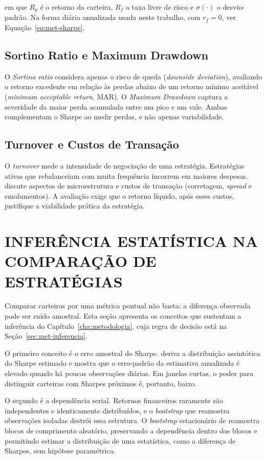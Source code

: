 \noindent em que $R_p$ é o retorno da carteira, $R_f$ a taxa livre de risco e $\sigma(\cdot)$ o desvio-padrão. Na forma diária anualizada usada neste trabalho, com $r_f = 0$, ver Equação~\eqref{eq:met-sharpe}.

\subsection{Sortino Ratio e Maximum Drawdown}

O \textit{Sortino ratio} \citep{Sortino1994} considera apenas o risco de queda (\textit{downside deviation}), avaliando o retorno excedente em relação às perdas abaixo de um retorno mínimo aceitável (\textit{minimum acceptable return}, MAR). O \textit{Maximum Drawdown} \citep{Magdon2004} captura a severidade da maior perda acumulada entre um pico e um vale. Ambas complementam o Sharpe ao medir perdas, e não apenas variabilidade.

\subsection{Turnover e Custos de Transação}

O \textit{turnover} mede a intensidade de negociação de uma estratégia. Estratégias ativas que rebalanceiam com muita frequência incorrem em maiores despesas. \citet{Harris2003} discute aspectos de microestrutura e custos de transação (corretagem, \textit{spread} e emolumentos). A avaliação exige que o retorno líquido, após esses custos, justifique a viabilidade prática da estratégia.

\section{INFERÊNCIA ESTATÍSTICA NA COMPARAÇÃO DE ESTRATÉGIAS}

Comparar carteiras por uma métrica pontual não basta: a diferença observada pode ser ruído amostral. Esta seção apresenta os conceitos que sustentam a inferência do Capítulo~\ref{cha:metodologia}, cuja regra de decisão está na Seção~\ref{sec:met-inferencia}.

O primeiro conceito é o erro amostral do Sharpe. \citet{Lo2002} deriva a distribuição assintótica do Sharpe estimado e mostra que o erro-padrão da estimativa anualizada é elevado quando há poucas observações diárias. Em janelas curtas, o poder para distinguir carteiras com Sharpes próximos é, portanto, baixo.

O segundo é a dependência serial. Retornos financeiros raramente são independentes e identicamente distribuídos, e o \textit{bootstrap} que reamostra observações isoladas destrói essa estrutura. O \textit{bootstrap} estacionário de \citet{Politis1994} reamostra blocos de comprimento aleatório, preservando a dependência dentro dos blocos e permitindo estimar a distribuição de uma estatística, como a diferença de Sharpes, sem hipótese paramétrica.


